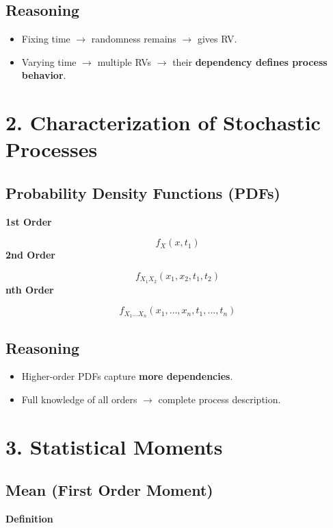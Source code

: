 \documentclass[12pt]{article}
\begin{document}
\subsection*{Reasoning}

\begin{itemize}
\item Fixing time $\rightarrow$ randomness remains $\rightarrow$ gives RV.
\item Varying time $\rightarrow$ multiple RVs $\rightarrow$ their \textbf{dependency defines process behavior}.
\end{itemize}

\section*{2. Characterization of Stochastic Processes}

\subsection*{Probability Density Functions (PDFs)}

\textbf{1st Order}

\[
f_X(x, t_1)
\]
\textbf{2nd Order}

\[
f_{X_1 X_2}(x_1, x_2, t_1, t_2)
\]
\textbf{nth Order}

\[
f_{X_1 \dots X_n}(x_1, \dots, x_n, t_1, \dots, t_n)
\]

\subsection*{Reasoning}

\begin{itemize}
\item Higher-order PDFs capture \textbf{more dependencies}.
\item Full knowledge of all orders $\rightarrow$ complete process description.
\end{itemize}

\section*{3. Statistical Moments}

\subsection*{Mean (First Order Moment)}

\textbf{Definition}
\end{document}
